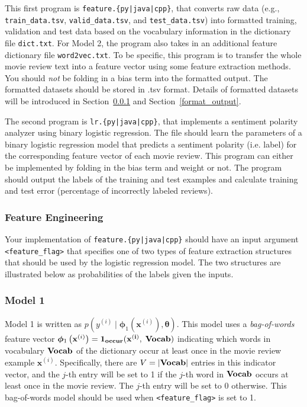 \documentclass[11pt,addpoints,answers]{exam}
\newcommand{\xv}{\mathbf{x}}
\newcommand{\thetav     }{\boldsymbol \theta     }
\begin{document}
This first program is \texttt{feature.\{py|java|cpp\}}, that converts raw data (e.g., \lstinline{train_data.tsv}, \lstinline{valid_data.tsv}, and \lstinline{test_data.tsv}) into formatted training, validation and test data based on the vocabulary information in the dictionary file \lstinline{dict.txt}. For Model 2, the program also takes in an additional feature dictionary file \lstinline{word2vec.txt}. To be specific, this program is to transfer the whole movie review text into a feature vector using some feature extraction methods. You should \emph{not} be folding in a bias term into the formatted output.
The formatted datasets should be stored in .tsv format. Details of formatted datasets will be introduced in Section~\ref{feature} and Section~\ref{format_output}.

The second program is \texttt{lr.\{py|java|cpp\}}, that implements a sentiment polarity analyzer using binary logistic regression. The file should learn the parameters of a binary logistic regression model that predicts a sentiment polarity (i.e. label) for the corresponding feature vector of each movie review. This program can either be implemented by folding in the bias term and weight or not. The program should output the labels of the training and test examples and calculate training and test error (percentage of incorrectly labeled reviews). 

\subsubsection{Feature Engineering} \label{feature}

Your implementation of \texttt{feature.\{py|java|cpp\}} should have an input argument \texttt{<feature\_flag>} that specifies one of two types of feature extraction structures that should be used by the logistic regression model. The two structures are illustrated below as probabilities of the labels given the inputs.

\subsubsection{Model 1}

Model 1 is written as $p\left(y^{(i)} \mid \boldsymbol{\phi}_1\left(\xv^{(i)}\right), \thetav\right)$. This model uses a \emph{bag-of-words} feature vector $\boldsymbol{\phi}_1\left(\xv^{(i)}\right) = \bf{1}_{occur}( \xv^{(i)},$ $\bf{Vocab})$ indicating which words in vocabulary $\bf{Vocab}$ of the dictionary occur at least once in the movie review example $\xv^{(i)}$. Specifically, there are $V=|\bf{Vocab}|$ entries in this indicator vector, and the $j$-th entry will be set to 1 if the $j$-th word in $\bf{Vocab}$ occurs at least once in the movie review. The $j$-th entry will be set to 0 otherwise. This bag-of-words model should be used when \texttt{<feature\_flag>} is set to 1.
    
\end{document}
